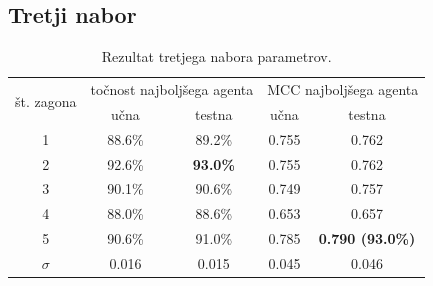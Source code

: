 \subsection{Tretji nabor}\label{subsec:dodatek-statlog-tretji-nabor}
\begin{table}[H]
    \begin{center}
        \begin{tabular}{|| c | c c || c c ||}
            \hline
            \multirow{2}{*}{št. zagona} & \multicolumn{2}{c||}{točnost najboljšega agenta} & \multicolumn{2}{c||}{MCC najboljšega agenta} \\ \cline{2-5}
            & učna   & testna          & učna  & testna                  \\
            \hline
            1        & 88.6\% & 89.2\%          & 0.755 & 0.762                   \\
            \hline
            2        & 92.6\% & \textbf{93.0\%} & 0.755 & 0.762                   \\
            \hline
            3        & 90.1\% & 90.6\%          & 0.749 & 0.757                   \\
            \hline
            4        & 88.0\% & 88.6\%          & 0.653 & 0.657                   \\
            \hline
            5        & 90.6\% & 91.0\%          & 0.785 & \textbf{0.790 (93.0\%)} \\
            \hline
            $\sigma$ & 0.016  & 0.015           & 0.045 & 0.046                   \\
            \hline
        \end{tabular}
    \end{center}
    \caption{Rezultat tretjega nabora parametrov.}
    \label{tab:statlog_result_3}
\end{table}


